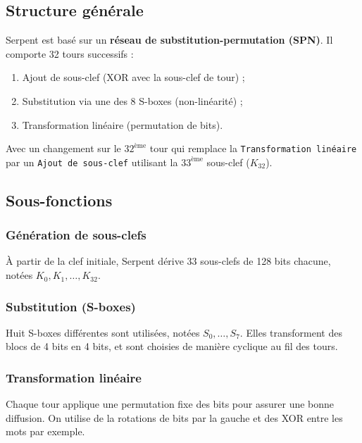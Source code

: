 \documentclass[12pt,a4paper]{report}
\begin{document}
\setcounter{subsection}{0}

\subsection{Structure générale}
Serpent est basé sur un \textbf{réseau de substitution-permutation (SPN)}.  
Il comporte 32 tours successifs :
\begin{enumerate}
    \item Ajout de sous-clef (XOR avec la sous-clef de tour) ;
    \item Substitution via une des 8 S-boxes (non-linéarité) ;
    \item Transformation linéaire (permutation de bits).
\end{enumerate}
Avec un changement sur le $32^{\text{ème}}$ tour qui remplace la \texttt{Transformation linéaire} par un \texttt{Ajout de sous-clef} utilisant la $33^{\text{ème}}$ sous-clef ($K_{32}$).

\subsection{Sous-fonctions}

\subsubsection{Génération de sous-clefs}
À partir de la clef initiale, Serpent dérive 33 sous-clefs de 128 bits chacune, notées $K_0, K_1, \dots, K_{32}$.

\subsubsection{Substitution (S-boxes)}
Huit S-boxes différentes sont utilisées, notées $S_0, \dots, S_7$.  
Elles transforment des blocs de 4 bits en 4 bits, et sont choisies de manière cyclique au fil des tours.

\subsubsection{Transformation linéaire}
Chaque tour applique une permutation fixe des bits pour assurer une bonne diffusion. On utilise de la rotations de bits par la gauche et des XOR entre les mots par exemple.
\end{document}
